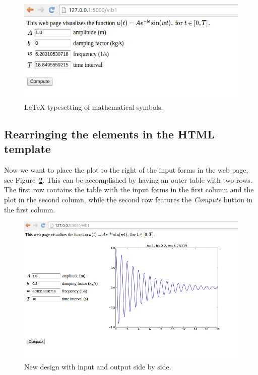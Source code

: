 \documentclass[%
oneside,                 %
final,                   %
10pt]{article}
\begin{document}
{{{{{{{{{{{{{{{{{{{{\begin{figure}[ht]
  \centerline{\includegraphics[width=0.9\linewidth]{fig-web4sa/vib1_flask_latex.png}}
  \caption{
  {\LaTeX} typesetting of mathematical symbols. \label{wf:vib1:flask:fig:latex}
  }
\end{figure}



\subsection{Rearringing the elements in the HTML template}

Now we want to place the plot to the right of the input forms in
the web page, see Figure~\ref{wf:vib1:flask:fig:sidebyside}. This can
be accomplished by having an outer table with two rows. The first
row contains the table with the input forms in the first column and
the plot in the second column, while the second row features the
\emph{Compute} button in the first column.


\begin{figure}[ht]
  \centerline{\includegraphics[width=0.9\linewidth]{fig-web4sa/vib1_flask_table2.png}}
  \caption{
  New design with input and output side by side. \label{wf:vib1:flask:fig:sidebyside}
  }
\end{figure}


}}}}}}}}}}}}}}}}}}}}
\end{document}
